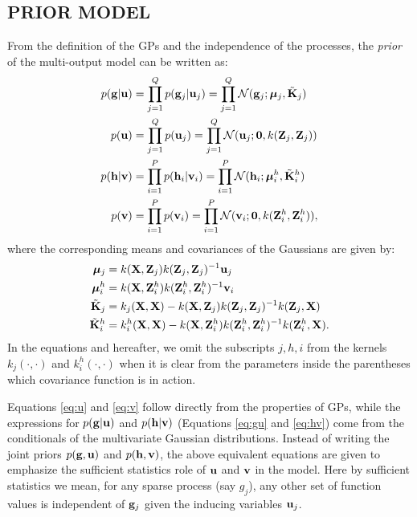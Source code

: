 \subsection{PRIOR MODEL}
From the definition of the GPs and the independence of the processes, 
the \emph{prior} of the multi-output model can be written as:
\begin{align}
\label{eq:gu}
p(\mathbf{g} | \mathbf{u}) &= \prod_{j=1}^Q p(\mathbf{g}_j | \mathbf{u}_j) = \prod_{j=1}^Q \mathcal{N}(\mathbf{g}_j; \boldsymbol{\mu}_j, \tilde{\mathbf{K}}_j )\\
\label{eq:u}
p(\mathbf{u}) &= \prod_{j=1}^Q p(\mathbf{u}_j) = \prod_{j=1}^Q \mathcal{N}(\mathbf{u}_j; \mathbf{0}, k(\mathbf{Z}_j, \mathbf{Z}_j)) \\
\label{eq:hv}
p(\mathbf{h} | \mathbf{v}) &= \prod_{i=1}^P p(\mathbf{h}_i | \mathbf{v}_i) = \prod_{i=1}^P \mathcal{N}(\mathbf{h}_i; \boldsymbol{\mu}^h_i, \tilde{\mathbf{K}}^h_i)\\
\label{eq:v}
p(\mathbf{v}) &= \prod_{i=1}^P p(\mathbf{v}_i) = \prod_{i=1}^P \mathcal{N}(\mathbf{v}_i; \mathbf{0}, k(\mathbf{Z}^h_i, \mathbf{Z}^h_i)),
\end{align}
where the corresponding means and covariances of the Gaussians are given by:
\begin{align}
 \boldsymbol{\mu}_j &= k(\mathbf{X},\mathbf{Z}_j)k(\mathbf{Z}_j,\mathbf{Z}_j)^{-1}\mathbf{u}_j \\
\boldsymbol{\mu}^h_i &= k(\mathbf{X},\mathbf{Z}^h_i)k(\mathbf{Z}^h_i,\mathbf{Z}^h_i)^{-1}\mathbf{v}_i \\
\tilde{\mathbf{K}}_j &= k_j(\mathbf{X},\mathbf{X}) - k(\mathbf{X},\mathbf{Z}_j)k(\mathbf{Z}_j,\mathbf{Z}_j)^{-1}k(\mathbf{Z}_j,\mathbf{X}) \\
\tilde{\mathbf{K}}^h_i &= k^h_i(\mathbf{X},\mathbf{X}) - k(\mathbf{X},\mathbf{Z}^h_i)k(\mathbf{Z}^h_i,\mathbf{Z}^h_i)^{-1}k(\mathbf{Z}^h_i,\mathbf{X}).
\end{align}
In the equations and hereafter, we omit the subscripts $j,h,i$ from the kernels $k_j(\cdot,\cdot)$ and $k^h_i(\cdot,\cdot)$ when it is clear from the parameters inside the parentheses which covariance function is in action.

Equations \eqref{eq:u} and \eqref{eq:v} follow directly from the properties of GPs, while the expressions for $p(\mathbf{g}|\mathbf{u})$ and $p(\mathbf{h}|\mathbf{v})$ (Equations  \eqref{eq:gu} and \eqref{eq:hv}) come from the conditionals of the multivariate Gaussian distributions.
Instead of writing the joint priors $p(\mathbf{g},\mathbf{u})$ and $p(\mathbf{h},\mathbf{v})$, the above equivalent equations are given to emphasize the sufficient statistics role of $\mathbf{u}$ and $\mathbf{v}$ in the model.
Here by sufficient statistics we mean, for any sparse process (say $g_j$), any other set of function values is 
independent of $\mathbf{g}_j$ given the inducing variables $\mathbf{u}_j$.
%
